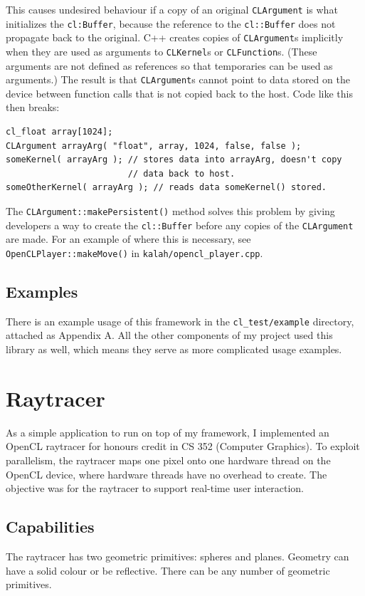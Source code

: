 \documentclass{article}
\begin{document}
This causes undesired behaviour if a copy of an original \texttt{CLArgument} is what initializes the \texttt{cl:Buffer}, because the reference to the \texttt{cl::Buffer} does not propagate back to the original. C++ creates copies of \texttt{CLArgument}s implicitly when they are used as arguments to \texttt{CLKernel}s or \texttt{CLFunction}s. (These arguments are not defined as references so that temporaries can be used as arguments.) The result is that \texttt{CLArgument}s cannot point to data stored on the device between function calls that is not copied back to the host. Code like this then breaks:

\begin{lstlisting}
cl_float array[1024];
CLArgument arrayArg( "float", array, 1024, false, false );
someKernel( arrayArg ); // stores data into arrayArg, doesn't copy
                        // data back to host.
someOtherKernel( arrayArg ); // reads data someKernel() stored.
\end{lstlisting}

The \texttt{CLArgument::makePersistent()} method solves this problem by giving developers a way to create the \texttt{cl::Buffer} before any copies of the \texttt{CLArgument} are made. For an example of where this is necessary, see \texttt{OpenCLPlayer::makeMove()} in \texttt{kalah/opencl\_player.cpp}.

\subsection{Examples}
There is an example usage of this framework in the \texttt{cl\_test/example} directory, attached as Appendix A. All the other components of my project used this library as well, which means they serve as more complicated usage examples.

\section{Raytracer}
As a simple application to run on top of my framework, I implemented an OpenCL raytracer for honours credit in CS 352 (Computer Graphics). To exploit parallelism, the raytracer maps one pixel onto one hardware thread on the OpenCL device, where hardware threads have no overhead to create. The objective was for the raytracer to support real-time user interaction.

\subsection{Capabilities}
The raytracer has two geometric primitives: spheres and planes. Geometry can have a solid colour or be reflective. There can be any number of geometric primitives.
\end{document}
